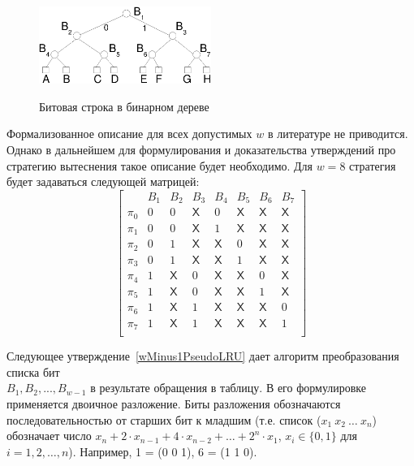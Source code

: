 \begin{figure}[h] \center
  \includegraphics[width=0.5\textwidth]{1.review/plru}\\
  \caption{Битовая строка в бинарном дереве}\label{plru_bittree}
\end{figure}

Формализованное описание для всех допустимых $w$ в литературе не
приводится. Однако в дальнейшем для формулирования и доказательства
утверждений про стратегию вытеснения \PseudoLRU такое описание будет
необходимо. Для $w=8$ стратегия будет задаваться следующей матрицей:
$$
\left[
  \begin{array}{c|ccccccc}
          & B_1 & B_2 & B_3 & B_4 & B_5 & B_6 & B_7 \\ \hline
    \pi_0 & 0 & 0 & \textsf{X} & 0 & \textsf{X} & \textsf{X} & \textsf{X} \\
    \pi_1 & 0 & 0 & \textsf{X} & 1 & \textsf{X} & \textsf{X} & \textsf{X} \\
    \pi_2 & 0 & 1 & \textsf{X} & \textsf{X} & 0 & \textsf{X} & \textsf{X} \\
    \pi_3 & 0 & 1 & \textsf{X} & \textsf{X} & 1 & \textsf{X} & \textsf{X} \\
    \pi_4 & 1 & \textsf{X} & 0 & \textsf{X} & \textsf{X} & 0 & \textsf{X} \\
    \pi_5 & 1 & \textsf{X} & 0 & \textsf{X} & \textsf{X} & 1 & \textsf{X} \\
    \pi_6 & 1 & \textsf{X} & 1 & \textsf{X} & \textsf{X} & \textsf{X} & 0 \\
    \pi_7 & 1 & \textsf{X} & 1 & \textsf{X} & \textsf{X} & \textsf{X} & 1 \\
  \end{array}
\right]
$$

Следующее утверждение~\ref{wMinus1PseudoLRU} дает алгоритм
преобразования списка бит\\ $B_1, B_2, ..., B_{w{-}1}$ в результате
обращения в таблицу. В его формулировке применяется двоичное
разложение. Биты разложения обозначаются последовательностью от
старших бит к младшим (т.е. список ($x_1~x_2~\dots~x_n$) обозначает
число $x_n + 2\cdot x_{n-1} + 4\cdot x_{n-2} + \dots + 2^n\cdot x_1$, $x_i \in
\{0,
1\}$ для $i = 1, 2, \dots, n$). Например, 1 = (0 0 1), 6 = (1 1 0).

